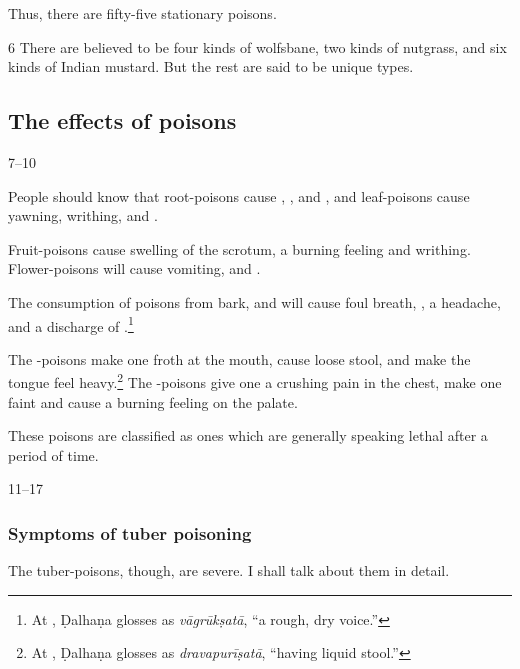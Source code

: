 \begin{translation}
    Thus, there are fifty-five stationary poisons.
    
    \item[6]
    There are believed to be four kinds of wolfsbane, two kinds of nutgrass, and
    six kinds of Indian mustard.  But the rest are said to be unique types.
    
    
    
    \subsection{The effects of poisons}
    \item[7--10]
    
People should know that root-poisons cause , 
, and
, and  leaf-poisons cause yawning, writhing, and 
.
    
 Fruit-poisons cause swelling of the
   scrotum, a burning feeling and writhing.  Flower-poisons will
    cause vomiting,  and .  
    
The consumption of poisons from bark,  and  
will
cause foul breath, , a headache, and a
discharge of .\footnote{At , Ḍalhaṇa
glosses  as \emph{vāgrūkṣatā}, “a rough, 
dry voice.”}
    
    
     The -poisons make one froth at the mouth,  cause loose
stool, and make the tongue feel heavy.\footnote{At , Ḍalhaṇa
glosses  as \emph{dravapurīṣatā}, “having liquid
stool.” }  The -poisons give one a crushing pain in the
chest, make one faint and cause a burning feeling on the palate.
    
    These poisons
    are classified as ones which are generally speaking lethal after a period of time.
    
    \item[11--17]
    
    \subsubsection{Symptoms of tuber poisoning}
    The tuber-poisons, though, are severe.  I shall talk about them in detail.
    
    

\end{translation}

